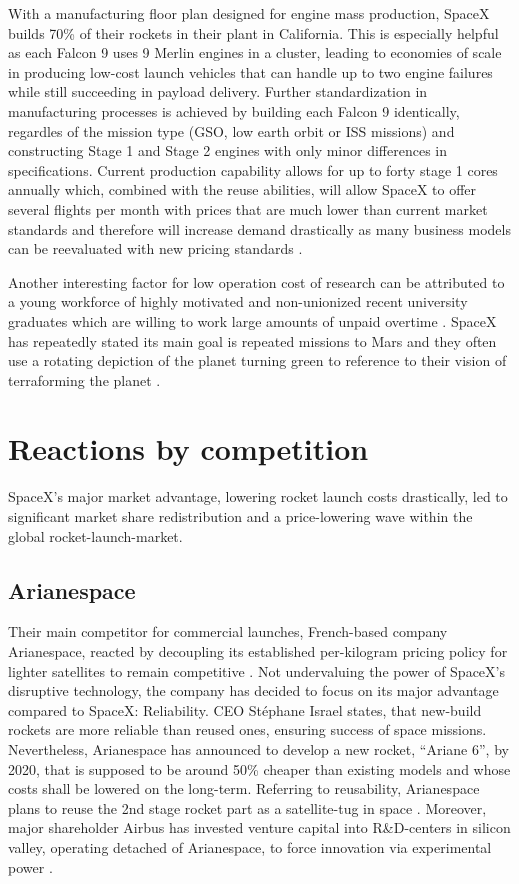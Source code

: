 \documentclass[11pt,a4paper]{article}
\begin{document}
With a manufacturing floor plan designed for engine mass production, SpaceX builds 70\% of their rockets in their plant in California. This is especially helpful as each Falcon 9 uses 9 Merlin engines in a cluster, leading to economies of scale in producing low-cost launch vehicles that can handle up to two engine failures while still succeeding in payload delivery.
Further standardization in manufacturing processes is achieved by building each Falcon 9 identically, regardles of the mission type (GSO, low earth orbit or ISS missions) and constructing Stage 1 and Stage 2 engines with only minor differences in specifications.
Current production capability allows for up to forty stage 1 cores annually which, combined with the reuse abilities, will allow SpaceX to offer several flights per month with prices that are much lower than current market standards \cite{scs33} and therefore will increase demand drastically as many business models can be reevaluated with new pricing standards \cite{scs33}.

Another interesting factor for low operation cost of research can be attributed to a young workforce of highly motivated and non-unionized recent university graduates which are willing to work large amounts of unpaid overtime \cite{scs4}. SpaceX has repeatedly stated its main goal is repeated missions to Mars and they often use a rotating depiction of the planet turning green to reference to their vision of terraforming the planet \cite{scs6}.
\section{Reactions by competition}\label{reactions-by-competition}
SpaceX’s major market advantage, lowering rocket launch costs drastically, led to significant market share redistribution and a price-lowering wave within the global rocket-launch-market.
\subsection{Arianespace}\label{arianespace}
Their main competitor for commercial launches, French-based company Arianespace, reacted by decoupling its established per-kilogram pricing policy for lighter satellites to remain competitive \cite{scs41}. Not undervaluing the power of SpaceX’s disruptive technology, the company has decided to focus on its  major advantage compared to SpaceX: Reliability. CEO Stéphane Israel states, that new-build rockets are more reliable than reused ones, ensuring success of space missions. Nevertheless, Arianespace has announced to develop a new rocket, “Ariane 6”, by 2020, that is supposed to be around 50\% cheaper than existing models and whose costs shall be lowered on the long-term. Referring to reusability, Arianespace plans to reuse the 2nd stage rocket part as a satellite-tug in space \cite{scs44}. Moreover, major shareholder Airbus has invested venture capital into R&D-centers in silicon valley, operating detached of Arianespace, to force innovation via experimental power \cite{scs45}.
\end{document}
